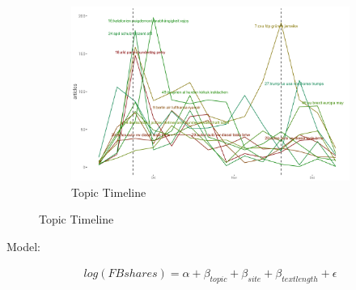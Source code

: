 \documentclass[12pt,a4paper,notitlepage]{article}
\begin{document}
\begin{figure}[H]
\begin{center}
\begin{subfigure}[normla]{0.9\textwidth}
			\includegraphics[width=\textwidth,keepaspectratio]{../figs/topic-timeline.png}
			\caption{Topic Timeline}
			\label{fig_topic_timeline}
		\end{subfigure}
	\end{center}
\end{figure}

Model: 

\begin{align*}
	log(FBshares) =\alpha+\beta_{topic}+\beta_{site}+\beta_{textlength}+\epsilon 
\end{align*}


%
%
%
%
%
%
\end{document}
